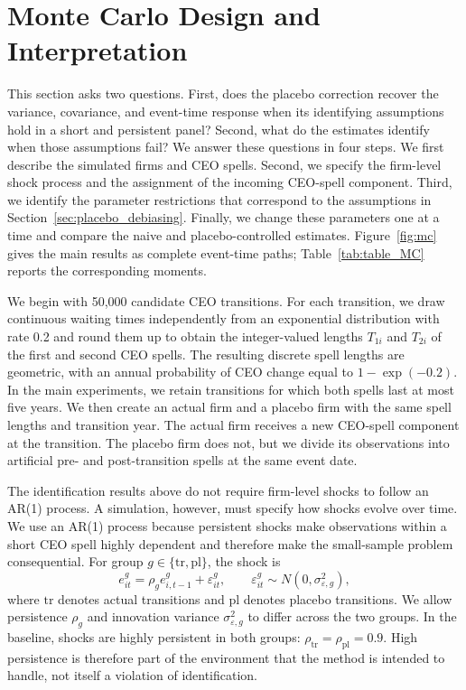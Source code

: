 \documentclass[sigconf,nonacm]{acmart}
\begin{document}
\section{Monte Carlo Design and Interpretation}\label{sec:MC}

This section asks two questions. First, does the placebo correction recover the variance, covariance, and event-time response when its identifying assumptions hold in a short and persistent panel? Second, what do the estimates identify when those assumptions fail? We answer these questions in four steps. We first describe the simulated firms and CEO spells. Second, we specify the firm-level shock process and the assignment of the incoming CEO-spell component. Third, we identify the parameter restrictions that correspond to the assumptions in Section~\ref{sec:placebo_debiasing}. Finally, we change these parameters one at a time and compare the naive and placebo-controlled estimates. Figure~\ref{fig:mc} gives the main results as complete event-time paths; Table~\ref{tab:table_MC} reports the corresponding moments.

We begin with 50,000 candidate CEO transitions. For each transition, we draw continuous waiting times independently from an exponential distribution with rate 0.2 and round them up to obtain the integer-valued lengths \(T_{1i}\) and \(T_{2i}\) of the first and second CEO spells. The resulting discrete spell lengths are geometric, with an annual probability of CEO change equal to \(1-\exp(-0.2)\). In the main experiments, we retain transitions for which both spells last at most five years. We then create an actual firm and a placebo firm with the same spell lengths and transition year. The actual firm receives a new CEO-spell component at the transition. The placebo firm does not, but we divide its observations into artificial pre- and post-transition spells at the same event date.

The identification results above do not require firm-level shocks to follow an AR(1) process. A simulation, however, must specify how shocks evolve over time. We use an AR(1) process because persistent shocks make observations within a short CEO spell highly dependent and therefore make the small-sample problem consequential. For group \(g\in\{\mathrm{tr},\mathrm{pl}\}\), the shock is
\begin{equation}
e_{it}^{g}
=
\rho_g e_{i,t-1}^{g}
+
\varepsilon_{it}^{g},
\qquad
\varepsilon_{it}^{g}
\sim
N\!\left(0,\sigma_{\varepsilon,g}^{2}\right),
\label{eq:mc_shock_process}
\end{equation}
where \(\mathrm{tr}\) denotes actual transitions and \(\mathrm{pl}\) denotes placebo transitions. We allow persistence \(\rho_g\) and innovation variance \(\sigma_{\varepsilon,g}^{2}\) to differ across the two groups. In the baseline, shocks are highly persistent in both groups: \(\rho_{\mathrm{tr}}=\rho_{\mathrm{pl}}=0.9\). High persistence is therefore part of the environment that the method is intended to handle, not itself a violation of identification.
\end{document}
